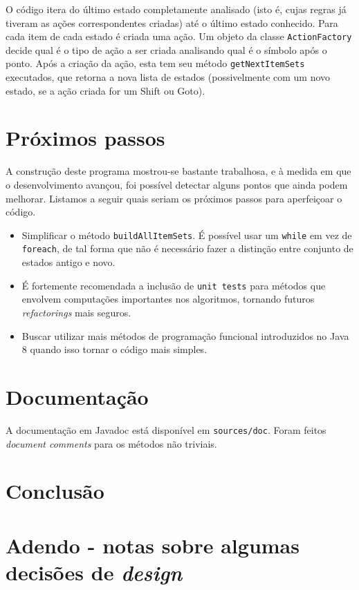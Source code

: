 \documentclass[11pt]{article}
\begin{document}
O código itera do último estado completamente analisado (isto é, cujas
regras já tiveram as ações correspondentes criadas) até o último estado conhecido.
Para cada item de cada estado é criada uma ação. Um objeto da classe
\texttt{ActionFactory} decide qual é o tipo de ação a ser criada analisando qual é o
símbolo após o ponto. Após a criação da ação, esta tem seu método
\texttt{getNextItemSets} executados, que retorna a nova lista de estados (possivelmente com
um novo estado, se a ação criada for um Shift ou Goto).

\section{Próximos passos}
\label{sec:orgheadline15}
A construção deste programa mostrou-se bastante trabalhosa, e à medida em que o
desenvolvimento avançou, foi possível detectar alguns pontos que ainda podem
melhorar. Listamos a seguir quais seriam os próximos passos para aperfeiçoar o código. 
\begin{itemize}
\item Simplificar o método \texttt{buildAllItemSets}. É possível usar um \texttt{while} em vez de
\texttt{foreach}, de tal forma que não é necessário fazer a distinção entre conjunto
de estados antigo e novo.
\item É fortemente recomendada a inclusão de \texttt{unit tests} para métodos que envolvem
computações importantes nos algoritmos, tornando futuros \emph{refactorings} mais seguros.
\item Buscar utilizar mais métodos de programação funcional introduzidos no Java 8
quando isso tornar o código mais simples.
\end{itemize}
\section{Documentação}
\label{sec:orgheadline16}
A documentação em Javadoc está disponível em \texttt{sources/doc}. Foram feitos
\emph{document comments} para os métodos não triviais.

\section{Conclusão}
\label{sec:orgheadline17}
\section{Adendo - notas sobre algumas decisões de \emph{design}}
\label{sec:orgheadline3}
\end{document}
